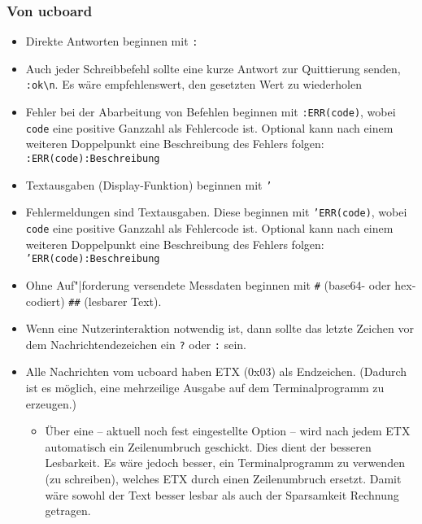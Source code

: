 \subsubsection{Von ucboard}
\begin{itemize}
	\item Direkte Antworten beginnen mit \texttt{:}
	\item Auch jeder Schreibbefehl sollte eine kurze Antwort zur Quittierung senden, \zB \verb+:ok\n+. Es wäre empfehlenswert, den gesetzten Wert zu wiederholen
	\item Fehler bei der Abarbeitung von Befehlen beginnen mit \texttt{:ERR(code)}, wobei \texttt{code} eine positive Ganzzahl als Fehlercode ist. Optional kann nach einem weiteren Doppelpunkt eine Beschreibung des Fehlers folgen: \texttt{:ERR(code):Beschreibung} 
	\item Textausgaben (Display-Funktion) beginnen mit \texttt{'}
	\item Fehlermeldungen sind Textausgaben. Diese beginnen mit \texttt{'ERR(code)}, wobei \texttt{code} eine positive Ganzzahl als Fehlercode ist. Optional kann nach einem weiteren Doppelpunkt eine Beschreibung des Fehlers folgen: \texttt{'ERR(code):Beschreibung} 
	\item Ohne Auf"|forderung versendete Messdaten beginnen mit \texttt{\#} (base64- oder hex-codiert) \bzw \texttt{\#\#} (lesbarer Text).
	\item Wenn eine Nutzerinteraktion notwendig ist, dann sollte das letzte Zeichen vor dem Nachrichtendezeichen ein \texttt{?} oder \texttt{:} sein.
	\item Alle Nachrichten vom ucboard haben ETX (0x03) als Endzeichen. (Dadurch ist es möglich, eine mehrzeilige Ausgabe auf dem Terminalprogramm zu erzeugen.)
		\begin{itemize}
			\item Über eine -- aktuell noch fest eingestellte Option -- wird nach jedem ETX automatisch ein Zeilenumbruch geschickt. Dies dient der besseren Lesbarkeit. Es wäre jedoch besser, ein Terminalprogramm zu verwenden (\bzw zu schreiben), welches ETX durch einen Zeilenumbruch ersetzt. Damit wäre sowohl der Text besser lesbar als auch der Sparsamkeit Rechnung getragen.
		\end{itemize}
\end{itemize}



